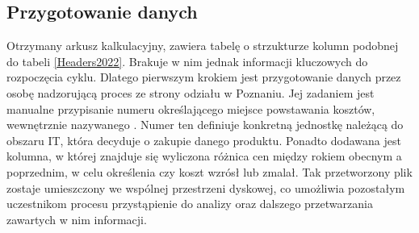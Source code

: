 \subsection{Przygotowanie danych}
Otrzymany arkusz kalkulacyjny, zawiera tabelę o strzukturze kolumn podobnej do tabeli \ref{Headers2022}. Brakuje w nim jednak informacji kluczowych do rozpoczęcia cyklu.
Dlatego pierwszym krokiem jest przygotowanie danych przez osobę nadzorującą proces ze strony odziału w Poznaniu. 
Jej zadaniem jest manualne przypisanie numeru określającego miejsce powstawania kosztów, wewnętrznie nazywanego . Numer ten definiuje konkretną jednostkę należącą do obszaru IT, która decyduje o zakupie danego produktu. Ponadto dodawana jest kolumna, w której znajduje się wyliczona różnica cen między rokiem obecnym a poprzednim, w celu określenia czy koszt wzrósł lub zmalał. Tak przetworzony plik zostaje umieszczony we wspólnej przestrzeni dyskowej, co umożliwia pozostałym uczestnikom procesu przystąpienie do analizy oraz dalszego przetwarzania zawartych w nim informacji.

\renewcommand{\arraystretch}{1.1} %
\begin{table}[H] %
    \begin{adjustwidth}{-50pt}{-20pt}
    \centering
    \caption{Nagłówki kolumn z arkusza kalkulacyjnego z roku 2022}
    \label{Headers2022}
    \end{adjustwidth}
\end{table}
